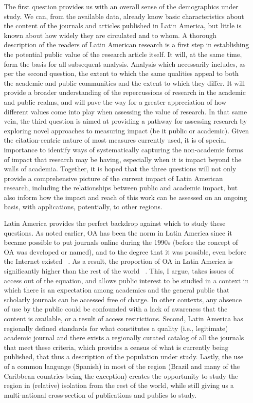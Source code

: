 The first question provides us with an overall sense of the demographics under study. We can, from the available data, already know basic characteristics about the content of the journals and articles published in Latin America, but little is known about how widely they are circulated and to whom. A thorough description of the readers of Latin American research is a first step in establishing the potential public value of the research article itself. It will, at the same time, form the basis for all subsequent analysis. Analysis which necessarily includes, as per the second question, the extent to which the same qualities appeal to both the academic and public communities and the extent to which they differ. It will provide a broader understanding of the repercussions of research in the academic and public realms, and will pave the way for a greater appreciation of how different values come into play when assessing the value of research. In that same vein, the third question is aimed at providing a pathway for assessing research by exploring novel approaches to measuring impact (be it public or academic). Given the citation-centric nature of most measures currently used, it is of special importance to identify ways of systematically capturing the non-academic forms of impact that research may be having, especially when it is impact beyond the walls of academia. Together, it is hoped that the three questions will not only provide a comprehensive picture of the current impact of Latin American research, including the relationships between public and academic impact, but also inform how the impact and reach of this work can be assessed on an ongoing basis, with applications, potentially, to other regions.

Latin America provides the perfect backdrop against which to study these questions. As noted earlier, OA has been the norm in Latin America since it became possible to put journals online during the 1990s (before the concept of OA was developed or named), and to the degree that it was possible, even before the Internet existed ~\citep{Alperin2008,Cetto1998,Estrada-Mejia2010}. As a result, the proportion of OA in Latin America is significantly higher than the rest of the world ~\citep{Haider:2005kx,Miguel2011}. This, I argue, takes issues of access out of the equation, and allows public interest to be studied in a context in which there is an expectation among academics and the general public that scholarly journals can be accessed free of charge. In other contexts, any absence of use by the public could be confounded with a lack of awareness that the content is available, or a result of access restrictions. Second, Latin America has regionally defined standards for what constitutes a quality (i.e., legitimate) academic journal and there exists a regionally curated catalog of all the journals that meet these criteria, which provides a census of what is currently being published, that thus a description of the population under study. Lastly, the use of a common language (Spanish) in most of the region (Brazil and many of the Caribbean countries being the exception) creates the opportunity to study the region in (relative) isolation from the rest of the world, while still giving us a multi-national cross-section of publications and publics to study.

